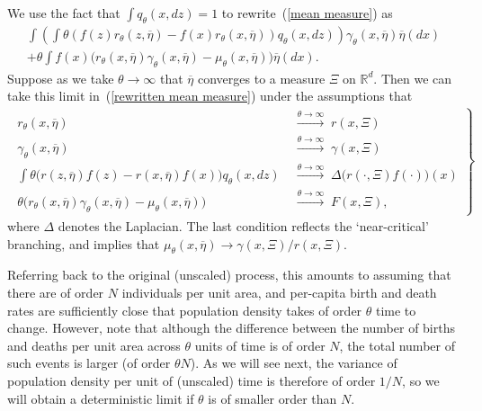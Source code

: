 \documentclass[12pt]{article}
\begin{document}
We use the fact that $\int q_\theta(x,dz)=1$ to rewrite~(\ref{mean measure})
as 
\begin{multline}
\label{rewritten mean measure}
    \int\left(
          \int \theta \left(
            f(z)r_\theta(z,\overline{\eta})
            -
            f(x)r_\theta(x,\overline{\eta})\right)
          q_\theta(x,dz)
        \right)
        \gamma_\theta(x,\overline{\eta})
    \overline{\eta}(dx) \\
    + 
    \theta\int f(x)
        \Big(
            r_\theta(x,\overline{\eta})
            \gamma_\theta(x,\overline{\eta})
            -
            \mu_\theta(x,\overline{\eta})
        \Big)
    \overline{\eta}(dx) .
\end{multline}
Suppose as we take $\theta \to \infty$ that
$\overline{\eta}$ converges to a measure $\Xi$ on $\mathbb{R}^d$.
Then we can take this limit in~(\ref{rewritten mean measure})
under the assumptions that
\begin{eqnarray} \label{near critical}
\left.
\begin{split}
    r_\theta(x,\overline{\eta})
        &\;  \stackrel{\theta\to\infty}{\longrightarrow} \;
        r(x,\Xi)
    \\
    \gamma_\theta(x,\overline{\eta})
        &\;  \stackrel{\theta\to\infty}{\longrightarrow} \;
        \gamma(x,\Xi)
    \\
    \int\theta \Big(
            r(z,\overline{\eta})f(z)
            -
            r(x,\overline{\eta})f(x)
        \Big)q_\theta(x,dz) 
        &\; \stackrel{\theta\to\infty}{\longrightarrow}  \;
        \Delta \big(r(\cdot,\Xi)f(\cdot)\big)(x)
    \\
    \theta \Big(
            r_\theta(x,\overline{\eta})
            \gamma_\theta (x,\overline{\eta})
            -
            \mu_\theta (x,\overline{\eta})
        \Big)
         &\; \stackrel{\theta\to\infty}{\longrightarrow}  \;
        F(x,\Xi),
\end{split}
\right\}
\end{eqnarray}
where $\Delta$ denotes the Laplacian.
The last condition reflects the `near-critical' branching,
and implies that $\mu_\theta(x, \overline{\eta}) \to \gamma(x, \Xi) / r(x, \Xi)$.

Referring back to the original (unscaled) process,
this amounts to assuming that
there are of order $N$ individuals per unit area,
and per-capita birth and death rates
are sufficiently close that population density takes of order $\theta$ time to change.
However, note that although the difference
between the number of births and deaths per unit area
across $\theta$ units of time is of order $N$,
the total number of such events is larger (of order $\theta N$).
As we will see next, the variance of population density per unit of (unscaled) time
is therefore of order $1/N$,
so we will obtain a deterministic limit if $\theta$ is of smaller order than $N$.
\end{document}
